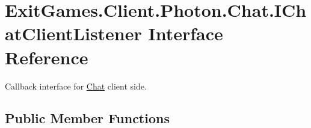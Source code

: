 \hypertarget{interface_exit_games_1_1_client_1_1_photon_1_1_chat_1_1_i_chat_client_listener}{}\section{Exit\+Games.\+Client.\+Photon.\+Chat.\+I\+Chat\+Client\+Listener Interface Reference}
\label{interface_exit_games_1_1_client_1_1_photon_1_1_chat_1_1_i_chat_client_listener}


Callback interface for \hyperlink{namespace_exit_games_1_1_client_1_1_photon_1_1_chat}{Chat} client side.  


\subsection*{Public Member Functions}
